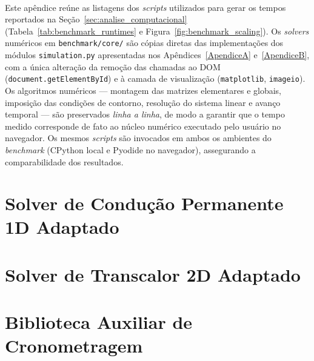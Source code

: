 \paragraph{}Este apêndice reúne as listagens dos \textit{scripts} utilizados para gerar os tempos reportados na Seção~\ref{sec:analise_computacional} (Tabela~\ref{tab:benchmark_runtimes} e Figura~\ref{fig:benchmark_scaling}). Os \textit{solvers} numéricos em \texttt{benchmark/core/} são cópias diretas das implementações dos módulos \texttt{simulation.py} apresentadas nos Apêndices~\ref{ApendiceA} e~\ref{ApendiceB}, com a única alteração da remoção das chamadas ao DOM (\texttt{document.getElementById}) e à camada de visualização (\texttt{matplotlib}, \texttt{imageio}). Os algoritmos numéricos --- montagem das matrizes elementares e globais, imposição das condições de contorno, resolução do sistema linear e avanço temporal --- são preservados \emph{linha a linha}, de modo a garantir que o tempo medido corresponde de fato ao núcleo numérico executado pelo usuário no navegador. Os mesmos \textit{scripts} são invocados em ambos os ambientes do \textit{benchmark} (CPython local e Pyodide no navegador), assegurando a comparabilidade dos resultados.

\section{Solver de Condução Permanente 1D Adaptado}
\label{ap:bench_cond_1d}



\section{Solver de Transcalor 2D Adaptado}
\label{ap:bench_transcalor_2d}



\section{Biblioteca Auxiliar de Cronometragem}
\label{ap:bench_lib}



